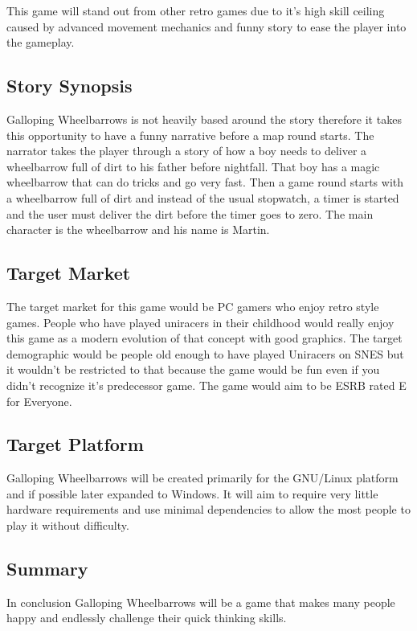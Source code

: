 \documentclass[12pt,]{article}
\begin{document}
This game will stand out from other retro games due to it's high skill
ceiling caused by advanced movement mechanics and funny story to ease
the player into the gameplay.

\hypertarget{story-synopsis}{%
\subsection{Story Synopsis}\label{story-synopsis}}

Galloping Wheelbarrows is not heavily based around the story therefore
it takes this opportunity to have a funny narrative before a map round
starts. The narrator takes the player through a story of how a boy needs
to deliver a wheelbarrow full of dirt to his father before nightfall.
That boy has a magic wheelbarrow that can do tricks and go very fast.
Then a game round starts with a wheelbarrow full of dirt and instead of
the usual stopwatch, a timer is started and the user must deliver the
dirt before the timer goes to zero. The main character is the
wheelbarrow and his name is Martin.

\hypertarget{target-market}{%
\subsection{Target Market}\label{target-market}}

The target market for this game would be PC gamers who enjoy retro style
games. People who have played uniracers in their childhood would really
enjoy this game as a modern evolution of that concept with good
graphics. The target demographic would be people old enough to have
played Uniracers on SNES but it wouldn't be restricted to that because
the game would be fun even if you didn't recognize it's predecessor
game. The game would aim to be ESRB rated E for Everyone.

\hypertarget{target-platform}{%
\subsection{Target Platform}\label{target-platform}}

Galloping Wheelbarrows will be created primarily for the GNU/Linux
platform and if possible later expanded to Windows. It will aim to
require very little hardware requirements and use minimal dependencies
to allow the most people to play it without difficulty.

\hypertarget{summary}{%
\subsection{Summary}\label{summary}}

In conclusion Galloping Wheelbarrows will be a game that makes many
people happy and endlessly challenge their quick thinking skills.
\end{document}
